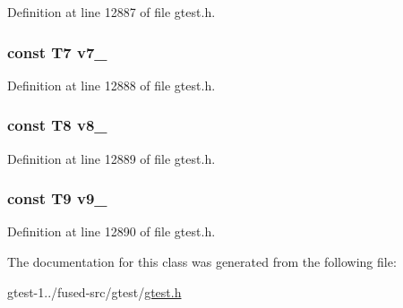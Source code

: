 \-Definition at line 12887 of file gtest.\-h.

\hypertarget{classtesting_1_1internal_1_1ValueArray45_a4063f0b7a528133d018ee488ba44a9a3}{
\subsubsection[{v7\-\_\-}]{\setlength{\rightskip}{0pt plus 5cm}const \-T7 {\bf v7\-\_\-}}}\label{d8/db6/classtesting_1_1internal_1_1ValueArray45_a4063f0b7a528133d018ee488ba44a9a3}


\-Definition at line 12888 of file gtest.\-h.

\hypertarget{classtesting_1_1internal_1_1ValueArray45_a596bc5260b2474271d1f6910ff6f665d}{
\subsubsection[{v8\-\_\-}]{\setlength{\rightskip}{0pt plus 5cm}const \-T8 {\bf v8\-\_\-}}}\label{d8/db6/classtesting_1_1internal_1_1ValueArray45_a596bc5260b2474271d1f6910ff6f665d}


\-Definition at line 12889 of file gtest.\-h.

\hypertarget{classtesting_1_1internal_1_1ValueArray45_a6356e16cf54a9dfac8525f20242af31e}{
\subsubsection[{v9\-\_\-}]{\setlength{\rightskip}{0pt plus 5cm}const \-T9 {\bf v9\-\_\-}}}\label{d8/db6/classtesting_1_1internal_1_1ValueArray45_a6356e16cf54a9dfac8525f20242af31e}


\-Definition at line 12890 of file gtest.\-h.



\-The documentation for this class was generated from the following file\-:\begin{DoxyCompactItemize}
\item 
gtest-\/1../fused-\/src/gtest/\hyperlink{fused-src_2gtest_2gtest_8h}{gtest.\-h}\end{DoxyCompactItemize}
